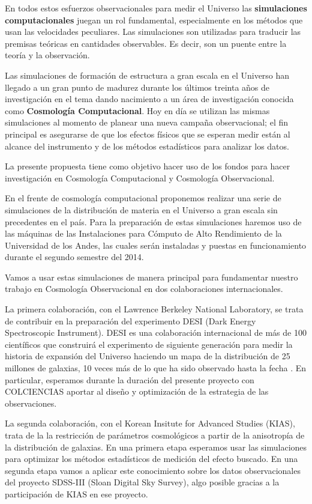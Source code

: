 \documentclass[12pt]{article}
\begin{document}
En todos estos esfuerzos observacionales para medir el Universo las
{\bf simulaciones computacionales} juegan un rol fundamental, especialmente
en los m\'etodos que usan las velocidades peculiares. Las simulaciones
son utilizadas para traducir las premisas te\'oricas en cantidades
observables. Es decir, son un puente entre la teor\'ia y la
observaci\'on. 

Las simulaciones de formaci\'on de estructura a gran escala en el
Universo han llegado a un gran punto de madurez durante los \'ultimos
treinta a\~nos de investigaci\'on en el tema dando nacimiento a un
\'area de investigaci\'on conocida como {\bf Cosmolog\'ia
  Computacional}. Hoy en d\'ia se utilizan las mismas simulaciones al
momento de planear una nueva campa\~na observacional; el fin principal
es asegurarse de que los efectos f\'isicos que se esperan medir
est\'an al alcance del instrumento y de los m\'etodos estad\'isticos
para analizar los datos. 

La presente propuesta tiene como objetivo hacer uso de los fondos para
hacer investigaci\'on en Cosmolog\'ia Computacional y Cosmolog\'ia
Observacional.  

En el frente de
cosmolog\'ia computacional proponemos realizar una serie de
simulaciones de la distribuci\'on de materia en el Universo a gran
escala sin precedentes en el pa\'is. Para la preparaci\'on de estas
simulaciones haremos uso de las m\'aquinas de las Instalaciones para
C\'omputo de Alto Rendimiento de la Universidad de los Andes, las
cuales ser\'an instaladas y puestas en funcionamiento durante el
segundo semestre del 2014.

Vamos a usar estas simulaciones de manera principal para fundamentar
nuestro trabajo en Cosmolog\'ia Observacional en dos colaboraciones
internacionales. 

La primera colaboraci\'on, con el Lawrence Berkeley National Laboratory,
se trata de contribuir en la preparaci\'on del experimento DESI (Dark
Energy Spectroscopic Instrument). DESI es una colaboraci\'on internacional de
m\'as de 100 cient\'ificos que construir\'a el experimento de
siguiente generaci\'on para medir la historia de expansi\'on del
Universo haciendo un mapa de la distribuci\'on de 25 millones de
galaxias, 10 veces m\'as de lo que ha sido observado hasta la fecha
\cite{DESI2013}. En particular, esperamos durante la duraci\'on del
presente proyecto con COLCIENCIAS aportar al dise\~no y optimizaci\'on
de la estrategia de las observaciones. 

La segunda colaboraci\'on, con el Korean Insitute for Advanced Studies
(KIAS), trata de la la restricci\'on de par\'ametros cosmol\'ogicos a
partir de la anisotrop\'ia de la distribuci\'on de galaxias. En una
primera etapa esperamos usar las simulaciones para optimizar los
m\'etodos estad\'isticos de medici\'on del efecto buscado. En una
segunda etapa vamos a aplicar este conocimiento sobre los datos
observacionales del proyecto SDSS-III (Sloan Digital Sky Survey),
algo posible gracias a la participaci\'on de KIAS en ese proyecto.
\end{document}
